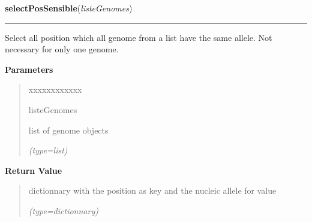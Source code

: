 \hspace{.8\funcindent}\begin{boxedminipage}{\funcwidth}

    \raggedright \textbf{selectPosSensible}(\textit{listeGenomes})

    \vspace{-1.5ex}

    \rule{\textwidth}{0.5\fboxrule}
\setlength{\parskip}{2ex}
    Select all position which all genome from a list have the same allele. 
    Not necessary for only one genome.

\setlength{\parskip}{1ex}
      \textbf{Parameters}
      \vspace{-1ex}

      \begin{quote}
        \begin{Ventry}{xxxxxxxxxxxx}

          \item[listeGenomes]

          list of genome objects

            {\it (type=list)}

        \end{Ventry}

      \end{quote}

      \textbf{Return Value}
    \vspace{-1ex}

      \begin{quote}
      dictionnary with the position as key and the nucleic allele for value

      {\it (type=dictionnary)}

      \end{quote}

    \end{boxedminipage}

    \label{script-FixedVar:genomeName_to_genomeObjet}

    \vspace{0.5ex}

